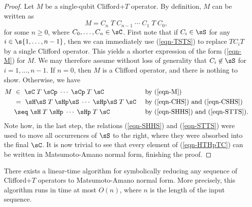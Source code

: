 \documentclass{article}
\begin{document}
\begin{proof}
  Let $M$ be a single-qubit Clifford+$T$ operator. By definition, $M$ can be
  written as
\begin{equation}\label{eqn-M}
  M = C_n\;T\;C_{n-1}\;\cdots\;C_1\;T\;C_0,
\end{equation}
for some $n\geq 0$, where $C_0,\ldots,C_n\in\sC$. First note that if
$C_i\in\sS$ for any $i\in\s{1,\ldots,n-1}$, then we can immediately
use (\ref{eqn-TSTS}) to replace $TC_iT$ by a single Clifford
operator. This yields a shorter expression of the form (\ref{eqn-M})
for $M$. We may therefore assume without loss of generality that
$C_i\not\in\sS$ for $i=1,\ldots,n-1$. If $n=0$, then $M$ is a Clifford
operator, and there is nothing to show. Otherwise, we have
\begin{align}
  M ~&\in~ \sC\;T\;\sCp\;\cdots\;\sCp\;T\;\sC &&\mbox{ by (\ref{eqn-M})}\\
  &=~ \sH\sS\;T\;\sHp\sS\;\cdots\;\sHp\sS\;T\;\sC &&\mbox{ by
    (\ref{eqn-CHS}) and (\ref{eqn-CSHS})}\\
  &\seq~ \sH\;T\;\sHp\;\cdots\;\sHp\;T\;\sC &&\mbox{ by
    (\ref{eqn-SHHS}) and (\ref{eqn-STTS}).}\label{eqn-HTHpTC}
\end{align}
Note how, in the last step, the relations (\ref{eqn-SHHS}) and
(\ref{eqn-STTS}) were used to move all occurrences of $\sS$ to the
right, where they were absorbed into the final $\sC$.  It is now
trivial to see that every element of (\ref{eqn-HTHpTC}) can be written
in Matsumoto-Amano normal form, finishing the proof.
\end{proof}

\begin{corollary}\label{cor-efficient}
  There exists a linear-time algorithm for symbolically reducing any
  sequence of Clifford+$T$ operators to Matsumoto-Amano normal form.
  More precisely, this algorithm runs in time at most $O(n)$, where
  $n$ is the length of the input sequence.
\end{corollary}
\end{document}
